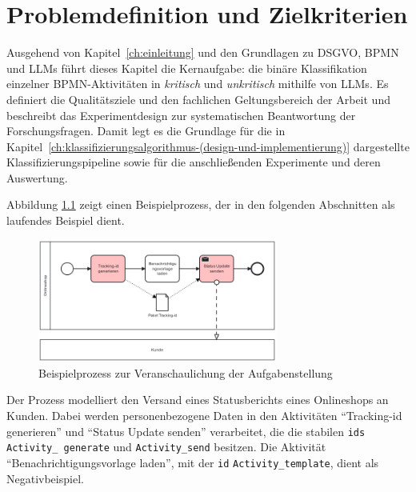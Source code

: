 \chapter{Problemdefinition und Zielkriterien}\label{ch:problemdefinition-und-zielkriterien}

Ausgehend von Kapitel~\ref{ch:einleitung} und den Grundlagen zu \ac{DSGVO}, \ac{BPMN} und \acp{LLM} führt dieses Kapitel die Kernaufgabe: die binäre Klassifikation einzelner \ac{BPMN}-Aktivitäten in \emph{kritisch} und \emph{unkritisch} mithilfe von \acp{LLM}. Es definiert die Qualitätsziele und den fachlichen Geltungsbereich der Arbeit und beschreibt das Experimentdesign zur systematischen Beantwortung der Forschungsfragen. Damit legt es die Grundlage für die in Kapitel~\ref{ch:klassifizierungsalgorithmus-(design-und-implementierung)} dargestellte Klassifizierungspipeline sowie für die anschließenden Experimente und deren Auswertung.

Abbildung \ref{fig:running_example} zeigt einen Beispielprozess, der in den folgenden Abschnitten als laufendes Beispiel dient.

\begin{figure}[h]
    \centering
    \includegraphics[width=0.7\textwidth]{images/running_example}
    \caption{Beispielprozess zur Veranschaulichung der Aufgabenstellung}
    \label{fig:running_example}
\end{figure}

Der Prozess modelliert den Versand eines Statusberichts eines Onlineshops an Kunden. Dabei werden personenbezogene Daten in den Aktivitäten \enquote{Tracking-id generieren} und \enquote{Status Update senden} verarbeitet, die die stabilen \texttt{ids} \texttt{Activity\_\linebreak~generate} und \texttt{Activity\_send} besitzen. Die Aktivität \enquote{Benachrichtigungsvorlage laden}, mit der \texttt{id} \texttt{Activity\_template}, dient als Negativbeispiel.





